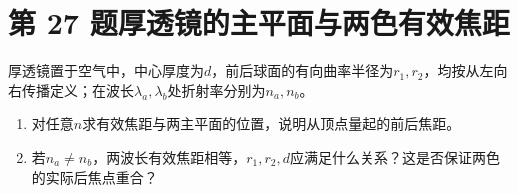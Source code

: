 \documentclass[UTF8,fontset=fandol,a4paper,11pt]{ctexart}
\begin{document}
\section*{第 27 题\quad 厚透镜的主平面与两色有效焦距}\label{q:27}

厚透镜置于空气中，中心厚度为$d$，前后球面的有向曲率半径为$r_1,r_2$，均按从左向右传播定义；在波长$\lambda_a,\lambda_b$处折射率分别为$n_a,n_b$。
\begin{enumerate}
\item 对任意$n$求有效焦距与两主平面的位置，说明从顶点量起的前后焦距。
\item 若$n_a\ne n_b$，两波长有效焦距相等，$r_1,r_2,d$应满足什么关系？这是否保证两色的实际后焦点重合？
\end{enumerate}

\begin{center}\begin{minipage}{.97\linewidth}\centering
\begin{tikzpicture}[x=.75cm,y=.5cm,font=\small]

\end{tikzpicture}
\end{minipage}
\end{center}
\end{document}
